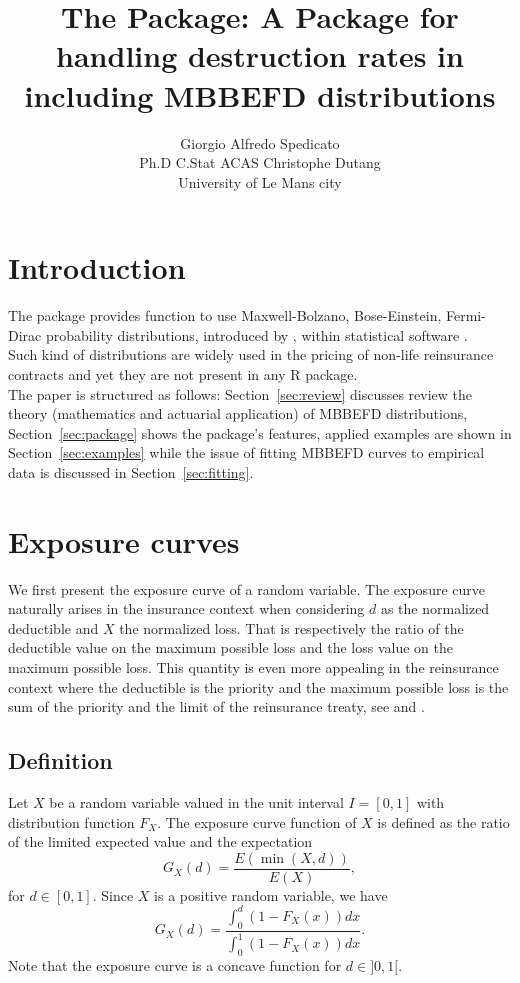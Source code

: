 \documentclass[article, nojss]{jss}
\author{Giorgio Alfredo Spedicato\\ Ph.D C.Stat ACAS \And Christophe Dutang\\ University of Le Mans city}
\title{The \pkg{mbbefd} Package: A Package for handling destruction rates in \proglang{R} including
MBBEFD distributions}
\begin{document}





\maketitle



\section{Introduction}

The  package provides function to use Maxwell-Bolzano, Bose-Einstein, Fermi-Dirac probability distributions, introduced by \cite{bernegger97}, within  statistical software \citep{rSoftware}.\\ Such kind of distributions are widely used in the pricing of non-life reinsurance contracts and yet they are not present in any R package.\\

The paper is structured as follows: Section~\ref{sec:review} discusses review the theory (mathematics and actuarial application) of MBBEFD distributions, Section~\ref{sec:package} shows the package's features, applied examples are shown in Section~\ref{sec:examples} while the issue of fitting MBBEFD curves to empirical data is discussed in Section~\ref{sec:fitting}.\\



\section{Exposure curves}
We first present the exposure curve of a random variable.
The exposure curve naturally arises in the insurance context when considering $d$ as the normalized 
deductible and $X$ the normalized loss. 
That is respectively the ratio of the deductible value on the maximum possible loss
and the loss value on the maximum possible loss.
This quantity is even more appealing in the reinsurance context where the deductible is
the priority and the maximum possible loss is the sum of the priority and
the limit of the reinsurance treaty, see \cite{bernegger97} and \cite{mahler}.


\subsection{Definition}
Let $X$ be a random variable valued in the unit interval $I=[0,1]$ with distribution function $F_X$.
The exposure curve function of $X$ is defined as the ratio of the limited expected value and the expectation
$$
G_X(d) = \frac{E(\min(X,d))}{E(X)}, 
$$
for $d\in [0,1]$.
Since $X$ is a positive random variable, we have
$$
G_X(d) = \frac{\int_0^d (1-F_X(x))dx }{\int_0^1 (1-F_X(x))dx }.
$$
Note that the exposure curve is a concave function for $d\in]0,1[$. 
\end{document}
